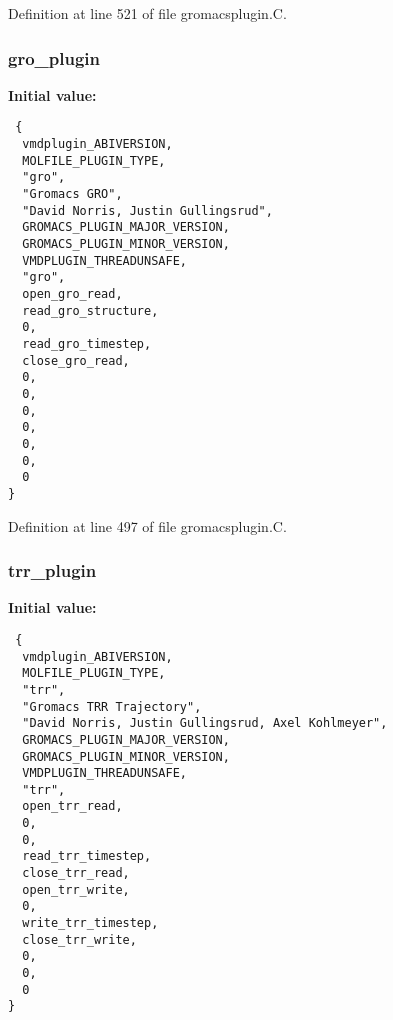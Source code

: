 Definition at line 521 of file gromacsplugin.C.
\subsubsection{ gro\_\-plugin\hspace{0.3cm}{\tt  [static]}}\label{gromacsplugin_8C_a3}


{\bf Initial value:}

\footnotesize\begin{verbatim} {
  vmdplugin_ABIVERSION,               
  MOLFILE_PLUGIN_TYPE,                
  "gro",                              
  "Gromacs GRO",                      
  "David Norris, Justin Gullingsrud", 
  GROMACS_PLUGIN_MAJOR_VERSION,       
  GROMACS_PLUGIN_MINOR_VERSION,       
  VMDPLUGIN_THREADUNSAFE,             
  "gro",                              
  open_gro_read,
  read_gro_structure,
  0,
  read_gro_timestep,
  close_gro_read,
  0,                                  
  0,                                  
  0,                                  
  0,                                  
  0,                                  
  0,                                  
  0                                   
}\end{verbatim}\normalsize 


Definition at line 497 of file gromacsplugin.C.
\subsubsection{ trr\_\-plugin\hspace{0.3cm}{\tt  [static]}}\label{gromacsplugin_8C_a5}


{\bf Initial value:}

\footnotesize\begin{verbatim} {
  vmdplugin_ABIVERSION,               
  MOLFILE_PLUGIN_TYPE,                
  "trr",                              
  "Gromacs TRR Trajectory",           
  "David Norris, Justin Gullingsrud, Axel Kohlmeyer", 
  GROMACS_PLUGIN_MAJOR_VERSION,       
  GROMACS_PLUGIN_MINOR_VERSION,       
  VMDPLUGIN_THREADUNSAFE,             
  "trr",                              
  open_trr_read,
  0,
  0,
  read_trr_timestep,
  close_trr_read,
  open_trr_write,
  0,                            
  write_trr_timestep,
  close_trr_write,
  0,                            
  0,                            
  0                             
}\end{verbatim}\normalsize 


